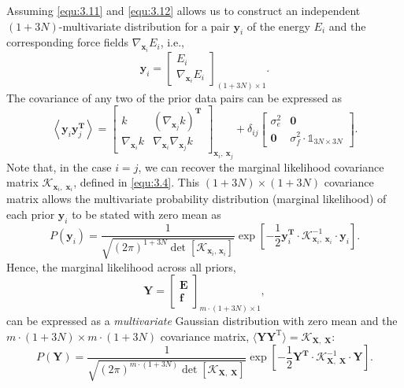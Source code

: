 Assuming \eqref{equ:3.11} and \eqref{equ:3.12} allows us to construct an independent $(1+3N)$-multivariate distribution for a pair $\mathbf{y}_{i}$ of the energy $E_{i}$ and the corresponding force fields $\nabla_{\mathbf{x}_{i}} E_{i}$, i.e., 
\[\mathbf{y}_{i}=\begin{bmatrix}
        E_{i} \\ \nabla_{\mathbf{x}_{i}} E_{i}
    \end{bmatrix}_{(1+3N)\times1}.\]
The covariance of any two of the prior data pairs can be expressed as 
\begin{equation}
    \label{equ:3.13}
    \left\langle 
    \mathbf{y}_{i}\mathbf{y}^{\mathbf{T}}_{j}
    \right\rangle = \begin{bmatrix}
             k & (\nabla_{\mathbf{x}_{j}} k)^{\textbf{T}}\\
             \nabla_{\mathbf{x}_{i}} k & \nabla_{\mathbf{x}_{i}}\nabla_{\mathbf{x}_{j}} k
\end{bmatrix}_{\mathbf{x}_{i},\: \mathbf{x}_{j}}
+\delta_{ij}
\begin{bmatrix}
             \sigma^{2}_{e} & \mathbf{0}\\
             \mathbf{0} & \sigma^{2}_{f}\cdot\mathbb{1}_{3N\times 3N}
\end{bmatrix}.
\end{equation}
Note that, in the case $i=j$, we can recover the marginal likelihood covariance matrix $\mathcal{K}_{\mathbf{x}_{i},\;\mathbf{x}_{i}}$, defined in \eqref{equ:3.4}.
This $(1+3N)\times(1+3N)$ covariance matrix allows the multivariate probability distribution (marginal likelihood) of each prior $\mathbf{y}_{i}$ to be stated with zero mean as
\begin{equation}
    \label{equ:3.14}
    P(\mathbf{y}_{i}) =
    \frac{1}{
        \sqrt{(2\pi)^{1+3N} \det\left[\mathcal{K}_{\mathbf{x}_{i},\, \mathbf{x}_{i}}\right]}
    }
    \exp\left[
        -\frac{1}{2}\mathbf{y}^{\mathbf{T}}_{i}\cdot\mathcal{K}^{-1}_{\mathbf{x}_{i},\;\mathbf{x}_{i}}\cdot\mathbf{y}_{i}
    \right].
\end{equation}
Hence, the marginal likelihood across all priors, 
\[\mathbf{Y}=\begin{bmatrix}
    \mathbf{E}\\
    \mathbf{f}
\end{bmatrix}_{m\cdot(1+3N)\times1},\]
can be expressed as a \textit{multivariate} Gaussian distribution with zero mean and the $m\cdot(1+3N)\times m\cdot(1+3N)$ covariance matrix, $\langle\textbf{Y}\textbf{Y}^{\text{T}}\rangle = \mathcal{K}_{\mathbf{X},\;\mathbf{X}}$:
\begin{equation}
    \label{equ:3.15}
    P(\mathbf{Y}) =
    \frac{1}{
        \sqrt{(2\pi)^{m\cdot(1+3N)} \det\left[\mathcal{K}_{\mathbf{X},\;\mathbf{X}}\right]}
    }
    \exp\left[
        -\frac{1}{2}\mathbf{Y}^{\mathbf{T}}\cdot\mathcal{K}^{-1}_{\mathbf{X},\;\mathbf{X}}\cdot\mathbf{Y}
    \right].
\end{equation}

